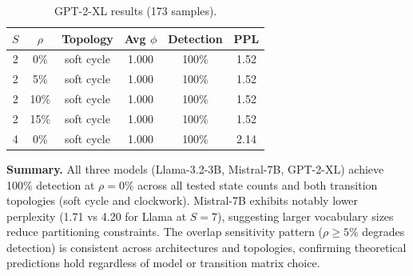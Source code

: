 \documentclass[11pt]{article}
\theoremstyle{definition}
\theoremstyle{remark}
\begin{document}
\begin{table}[H]
\centering
\caption{GPT-2-XL results (173 samples).}
\label{tab:gpt2}
\begin{tabular}{cccccc}
\toprule
$S$ & $\rho$ & Topology & Avg $\phi$ & Detection & PPL \\
\midrule
2 & 0\% & soft cycle & 1.000 & 100\% & 1.52 \\
2 & 5\% & soft cycle & 1.000 & 100\% & 1.52 \\
2 & 10\% & soft cycle & 1.000 & 100\% & 1.52 \\
2 & 15\% & soft cycle & 1.000 & 100\% & 1.52 \\
4 & 0\% & soft cycle & 1.000 & 100\% & 2.14 \\
\bottomrule
\end{tabular}
\end{table}

\textbf{Summary.} All three models (Llama-3.2-3B, Mistral-7B, GPT-2-XL) achieve 100\% detection at $\rho=0\%$ across all tested state counts and both transition topologies (soft cycle and clockwork). Mistral-7B exhibits notably lower perplexity (1.71 vs 4.20 for Llama at $S=7$), suggesting larger vocabulary sizes reduce partitioning constraints. The overlap sensitivity pattern ($\rho \geq 5\%$ degrades detection) is consistent across architectures and topologies, confirming theoretical predictions hold regardless of model or transition matrix choice.




\vspace{1em}
\end{document}
